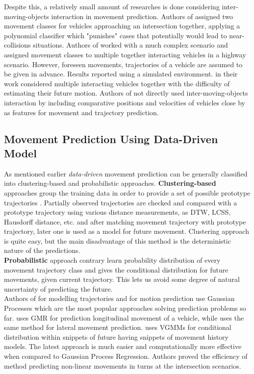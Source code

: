 Despite this, a relatively small amount of researches is done considering inter-moving-objects interaction in movement prediction. Authors of \cite{InterAwareI} assigned two movement classes for vehicles approaching an intersection together, applying a polynomial classifier which "punishes" cases that potentially would lead to near-collisions situations. Authors of \cite{InterAwareII} worked with a much complex scenario and assigned movement classes to multiple together interacting vehicles in a highway scenario. However, foreseen movements, trajectories of a vehicle are assumed to be given in advance. Results reported using a simulated environment. \cite{ClassificationII} in their work considered multiple interacting vehicles together with the difficulty of estimating their future motion.  Authors of \cite{DataDrivenV} not directly used inter-moving-objects interaction by including comparative positions and velocities of vehicles close by as features for movement and trajectory prediction.

\subsection{Movement Prediction Using Data-Driven Model}
\label{subsection:ddr}

As mentioned earlier \textit{data-driven} movement prediction can be generally classified into clustering-based and probabilistic approaches.  \textbf{Clustering-based} approaches group the training data in order to provide a set of possible prototype trajectories \cite{DataDrivenI, DataDrivenII}. Partially observed trajectories are checked and compared with a prototype trajectory using various distance measurements, as \gls{DTW}, \gls{LCSS}, Hausdorff distance, etc. and after matching movement trajectory with prototype trajectory, later one is used as a model for future movement. Clustering approach is quite easy, but the main disadvantage of this method is the deterministic nature of the predictions. \\

\textbf{Probabilistic} approach contrary learn probability distribution of every movement trajectory class and gives the conditional distribution for future movements, given current trajectory. This lets us avoid some degree of natural uncertainty of predicting the future. \\

Authors of \cite{DataDrivenIII, DataDrivenIV} for modelling trajectories and for motion prediction use Gaussian Processes which are the most popular approaches solving prediction problems so far. \cite{DataDrivenV} uses \gls{GMR} for prediction longitudinal movement of a vehicle, while \cite{DataDrivenVI} uses the same method for lateral movement prediction. \cite{DataDrivenVII} uses \glspl{VGMM} for conditional distribution within snippets of future having snippets of movement history models. The latest approach is much easier and computationally more effective when compared to Gaussian Process Regression.  Authors proved the efficiency of method predicting non-linear movements in turns at the intersection scenarios. 

